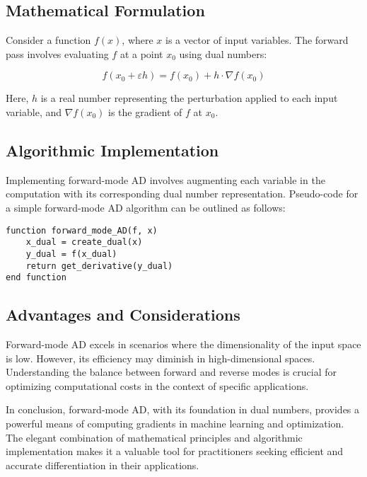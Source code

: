 \documentclass[hidelinks]{article}
\begin{document}
\subsection{Mathematical Formulation}

Consider a function $f(x)$, where $x$ is a vector of input variables. The forward pass involves evaluating $f$ at a point $x_0$ using dual numbers:

\[
f(x_0 + \varepsilon h) = f(x_0) + h \cdot \nabla f(x_0)
\]

Here, $h$ is a real number representing the perturbation applied to each input variable, and $\nabla f(x_0)$ is the gradient of $f$ at $x_0$.

\subsection{Algorithmic Implementation}

Implementing forward-mode AD involves augmenting each variable in the computation with its corresponding dual number representation. Pseudo-code for a simple forward-mode AD algorithm can be outlined as follows:

\begin{verbatim}
function forward_mode_AD(f, x)
    x_dual = create_dual(x)
    y_dual = f(x_dual)
    return get_derivative(y_dual)
end function
\end{verbatim}


\subsection{Advantages and Considerations}

Forward-mode AD excels in scenarios where the dimensionality of the input space is low. However, its efficiency may diminish in high-dimensional spaces. Understanding the balance between forward and reverse modes is crucial for optimizing computational costs in the context of specific applications.

In conclusion, forward-mode AD, with its foundation in dual numbers, provides a powerful means of computing gradients in machine learning and optimization. The elegant combination of mathematical principles and algorithmic implementation makes it a valuable tool for practitioners seeking efficient and accurate differentiation in their applications.



 
\end{document}
